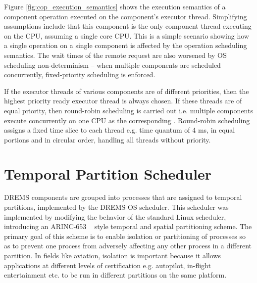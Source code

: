 Figure \ref{fig:cop_execution_semantics} shows the execution semantics of a component operation executed on the component's executor thread. Simplifying assumptions include that this component is the only component thread executing on the CPU, assuming a single core CPU. This is a simple scenario showing how a single operation on a single component is affected by the operation scheduling semantics. The wait times of the remote request are also worsened by OS scheduling non-determinism -- when multiple components are scheduled concurrently, fixed-priority scheduling is enforced. 

If the executor threads of various components are of different priorities, then the highest priority ready executor thread is always chosen. If these threads are of equal priority, then round-robin scheduling is carried out i.e. multiple components execute concurrently on one CPU as the corresponding . Round-robin scheduling assigns a fixed time slice to each thread e.g. time quantum of 4 ms, in equal portions and in circular order, handling all threads without priority. 



\section{Temporal Partition Scheduler}

DREMS components are grouped into processes that are assigned to temporal partitions, implemented by the DREMS OS scheduler. This scheduler was implemented by modifying the behavior of the standard Linux scheduler, introducing an ARINC-653 ~\cite{ARINC-653} style temporal and spatial partitioning scheme. The primary goal of this scheme is to enable isolation or partitioning of processes so as to prevent one process from adversely affecting any other process in a different partition. %
In fields like aviation, isolation is important because it allows applications at different levels of certification e.g. autopilot, in-flight entertainment etc. to be run in different partitions on the same platform. %

